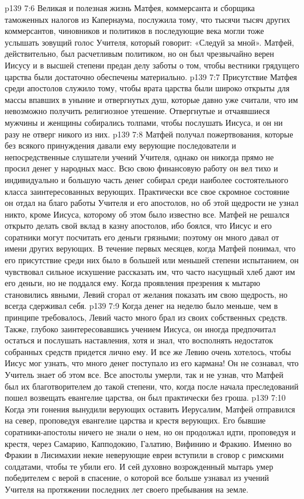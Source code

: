 \vs p139 7:6 Великая и полезная жизнь Матфея, коммерсанта и сборщика таможенных налогов из Капернаума, послужила тому, что тысячи тысяч других коммерсантов, чиновников и политиков в последующие века могли тоже услышать зовущий голос Учителя, который говорит: «Следуй за мной». Матфей, действительно, был расчетливым политиком, но он был чрезвычайно верен Иисусу и в высшей степени предан делу заботы о том, чтобы вестники грядущего царства были достаточно обеспечены материально.
\vs p139 7:7 Присутствие Матфея среди апостолов служило тому, чтобы врата царства были широко открыты для массы впавших в уныние и отвергнутых душ, которые давно уже считали, что им невозможно получить религиозное утешение. Отвергнутые и отчаявшиеся мужчины и женщины собирались толпами, чтобы послушать Иисуса, и он ни разу не отверг никого из них.
\vs p139 7:8 \pc Матфей получал пожертвования, которые без всякого принуждения давали ему верующие последователи и непосредственные слушатели учений Учителя, однако он никогда прямо не просил денег у народных масс. Всю свою финансовую работу он вел тихо и индивидуально и большую часть денег собирал среди наиболее состоятельного класса заинтересованных верующих. Практически все свое скромное состояние он отдал на благо работы Учителя и его апостолов, но об этой щедрости не узнал никто, кроме Иисуса, которому об этом было известно все. Матфей не решался открыто делать свой вклад в казну апостолов, ибо боялся, что Иисус и его соратники могут посчитать его деньги грязными; поэтому он много давал от имени других верующих. В течение первых месяцев, когда Матфей понимал, что его присутствие среди них было в большей или меньшей степени испытанием, он чувствовал сильное искушение рассказать им, что часто насущный хлеб дают им его деньги, но не поддался ему. Когда проявления презрения к мытарю становились явными, Левий сгорал от желания показать им свою щедрость, но всегда сдерживал себя.
\vs p139 7:9 Когда денег на неделю было меньше, чем в принципе требовалось, Левий часто много брал из своих собственных средств. Также, глубоко заинтересовавшись учением Иисуса, он иногда предпочитал остаться и послушать наставления, хотя и знал, что восполнять недостаток собранных средств придется лично ему. И все же Левию очень хотелось, чтобы Иисус мог узнать, что много денег поступало из его кармана! Он не сознавал, что Учитель знает об этом все. Все апостолы умерли, так и не узнав, что Матфей был их благотворителем до такой степени, что, когда после начала преследований пошел возвещать евангелие царства, он был практически без гроша.
\vs p139 7:10 \pc Когда эти гонения вынудили верующих оставить Иерусалим, Матфей отправился на север, проповедуя евангелие царства и крестя верующих. Его бывшие соратники\hyp{}апостолы ничего не знали о нем, но он продолжал идти, проповедуя и крестя, через Самарию, Капподокию, Галатию, Вифинию и Фракию. Именно во Фракии в Лисимахии некие неверующие евреи вступили в сговор с римскими солдатами, чтобы те убили его. И сей духовно возрожденный мытарь умер победителем с верой в спасение, о которой все больше узнавал из учений Учителя на протяжении последних лет своего пребывания на земле.
